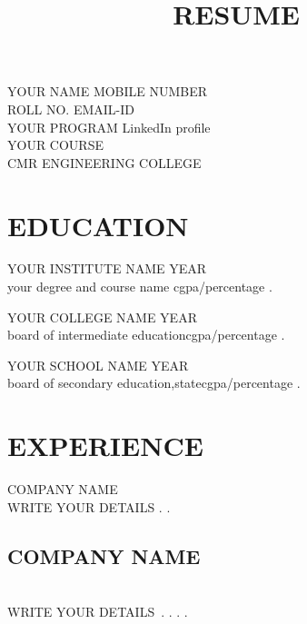 \documentclass{article}
\title{RESUME}
\date{\hspace{5cm}{DATE-MONTH-YEAR}}
\date{}
\begin{document}
\maketitle


YOUR NAME                  \hspace{4.2cm} MOBILE NUMBER
\\ROLL NO.                  \hspace{6.1CM} EMAIL-ID
\\YOUR PROGRAM  \hspace{4.8CM} LinkedIn profile
\\YOUR COURSE
\\CMR ENGINEERING COLLEGE
\section{EDUCATION}
\hline

\item{YOUR INSTITUTE NAME}      \hspace{5cm} YEAR
\\your degree and course name\hspace{5cm} cgpa/percentage
\newline.
\item{YOUR COLLEGE NAME}       \hspace{5.3CM} YEAR
\\board of intermediate education\hspace{4.7CM}cgpa/percentage
\newline.
\item{YOUR SCHOOL NAME}\hspace{5.7CM} YEAR
\\board of secondary education,state\hspace{4.2CM}cgpa/percentage
\newline.
\section{EXPERIENCE}
\hline

\item {COMPANY NAME}
\\WRITE YOUR DETAILS
\newline.
\newline.
\subsection{COMPANY NAME}
\\WRITE YOUR DETAILS\
\newline.
\newline.
\newline.
\newline.
\end{document}
